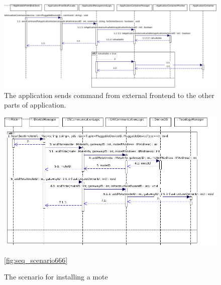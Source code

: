     \begin{figure}[!htp]
    	\centering
    	\includegraphics[width=\textwidth]{images/sequence-UC12-UC26-UC27}
    	\caption[Sending actuation commands via a mobile app]{ The application sends command from external frontend to the other parts of application. }\label{fig:seq_scenario9}
    \end{figure}

    \begin{figure}[!htp]
    	\centering
    	\includegraphics[width=\textwidth]{images/sequence-UC04}
    	\caption[Install mote]{The scenario for installing a mote}\ref{fig:seq_scenario666}
    \end{figure}
